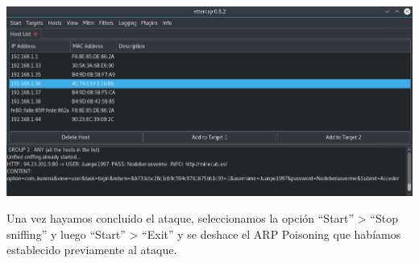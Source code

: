 \begin{enumerate}
	\begin{center}
		\includegraphics[scale=0.38]{e5.png}
	\end{center}
\end{enumerate}

Una vez hayamos concluido el ataque, seleccionamos la opción ``Start'' > ``Stop sniffing'' y luego ``Start'' > ``Exit'' y se deshace el ARP Poisoning que habíamos establecido previamente al ataque.